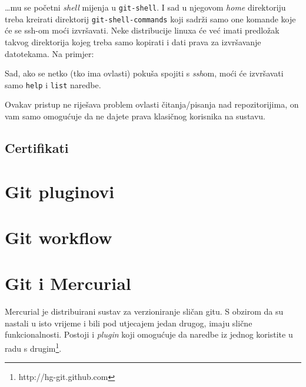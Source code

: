 \dots{}mu se početni \emph{shell} mijenja u \verb+git-shell+.
I sad u njegovom \emph{home} direktoriju treba kreirati direktorij \verb+git-shell-commands+ koji sadrži samo one komande koje će se ssh-om moći izvršavati.
Neke distribucije linuxa će već imati predložak takvog direktorija kojeg treba samo kopirati i dati prava za izvršavanje datotekama.
Na primjer:


Sad, ako se netko (tko ima ovlasti) pokuša spojiti s \emph{ssh}om, moći će izvršavati samo \verb+help+ i \verb+list+ naredbe.

Ovakav pristup ne riješava problem ovlasti čitanja/pisanja nad repozitorijima, on vam samo omogućuje da ne dajete prava klasičnog korisnika na sustavu.

\subsection*{Certifikati}

\TODO

\section*{Git pluginovi}

\TODO

\section*{Git workflow}

\TODO

\section*{Git i Mercurial}

Mercurial je distribuirani sustav za verzioniranje sličan gitu.
S obzirom da su nastali u isto vrijeme i bili pod utjecajem jedan drugog, imaju slične funkcionalnosti.
Postoji i \emph{plugin} koji omogućuje da naredbe iz jednog koristite u radu s drugim\footnote{http://hg-git.github.com}.

